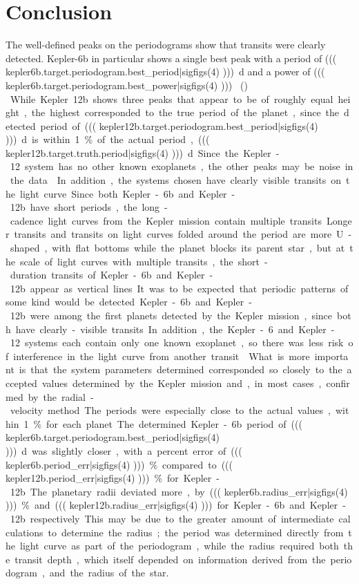 \section{Conclusion}

The well-defined peaks on the periodograms show that transits were clearly detected. Kepler-6b in particular shows a single
best peak with a period of \SI{((( kepler6b.target.periodogram.best_period|sigfigs(4) )))}{\day} and a power of
\SI{((( kepler6b.target.periodogram.best_power|sigfigs(4) )))}{ (\electron\per\second)  \per \day{} }. While Kepler 12b
shows three peaks that appear to be of roughly equal height, the highest corresponded to the true period of the planet, since the detected
period of \SI{((( kepler12b.target.periodogram.best_period|sigfigs(4) )))}{\day} is within \SI{1}{\percent} of the actual period, \SI{((( kepler12b.target.truth.period|sigfigs(4) )))}{\day}.
Since the Kepler-12 system has no other known exoplanets, the other peaks may be noise in the data. \autocite{exoplanetArchive}.
In addition, the systems chosen have clearly visible transits on the light curve. Since both Kepler-6b and Kepler-12b have short periods,
the long-cadence light curves from the Kepler mission contain multiple transits. Longer transits and transits on light curves folded around the period
are more U-shaped, with flat bottoms while the planet blocks its parent star, but at the scale of light curves with multiple transits,
the short-duration transits of Kepler-6b and Kepler-12b appear as vertical lines.

It was to be expected that periodic patterns of some kind would be detected. Kepler-6b and Kepler-12b were among the first planets
detected by the Kepler mission, since both have clearly-visible transits. In addition, the Kepler-6 and Kepler-12 systems each contain
only one known exoplanet, so there was less risk of interference in the light curve from another transit. \autocite{exoplanetArchive}. What is
more important is that the system parameters determined corresponded so closely to the accepted values determined by the Kepler mission
and, in most cases, confirmed by the radial-velocity method. The periods were especially close to the actual values, within \SI{1}{\percent} for
each planet. The determined Kepler-6b period of \SI{((( kepler6b.target.periodogram.best_period|sigfigs(4) )))}{\day} was slightly closer, with a percent error of
\SI{((( kepler6b.period_err|sigfigs(4) )))}{\percent} compared to \SI{((( kepler12b.period_err|sigfigs(4) )))}{\percent} for Kepler-12b. The planetary
radii deviated more, by \SI{((( kepler6b.radius_err|sigfigs(4) )))}{\percent} and \SI{((( kepler12b.radius_err|sigfigs(4) )))} for Kepler-6b and Kepler-12b
respectively. This may be due to the greater amount of intermediate calculations to determine the radius; the period was determined directly from the light curve
as part of the periodogram, while the radius required both the transit depth, which itself depended on information derived from the periodogram, and the radius
of the star.

